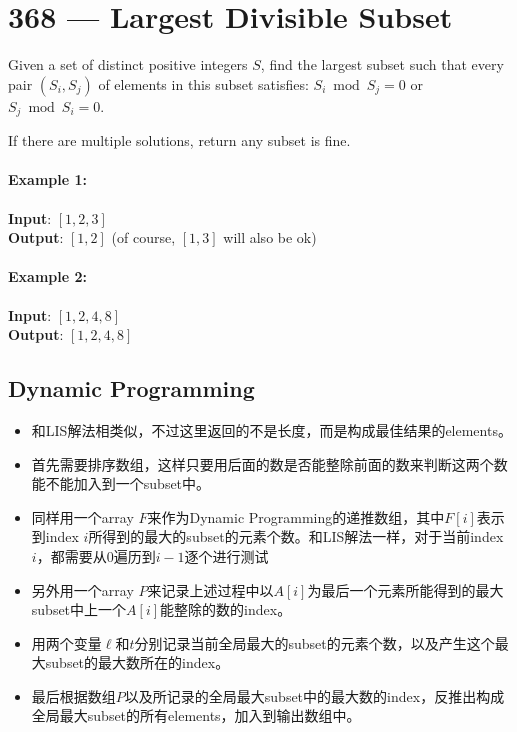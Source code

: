 \section{368 --- Largest Divisible Subset}
Given a set of distinct positive integers $S$, find the largest subset such that every pair $(S_i, S_j)$ of elements in this subset satisfies: $S_i \bmod S_j = 0$ or $S_j \bmod S_i = 0$.
\par
If there are multiple solutions, return any subset is fine.

\paragraph{Example 1:}

\begin{flushleft}
\textbf{Input}: $ [1,2,3] $
\\
\textbf{Output}: $ [1,2] $ (of course, $ [1,3] $ will also be ok)
\end{flushleft}

\paragraph{Example 2:}

\begin{flushleft}
\textbf{Input}: $ [1,2,4,8] $
\\
\textbf{Output}: $ [1,2,4,8] $
\end{flushleft}

\subsection{Dynamic Programming}
\begin{itemize}
\item 和LIS解法相类似，不过这里返回的不是长度，而是构成最佳结果的elements。
\item 首先需要排序数组，这样只要用后面的数是否能整除前面的数来判断这两个数能不能加入到一个subset中。 
\item 同样用一个array $F$来作为Dynamic Programming的递推数组，其中$F[i]$表示到index $i$所得到的最大的subset的元素个数。和LIS解法一样，对于当前index $i$，都需要从0遍历到$i-1$逐个进行测试
\item 另外用一个array $P$来记录上述过程中以$A[i]$为最后一个元素所能得到的最大subset中上一个$A[i]$能整除的数的index。
\item 用两个变量$\ell$和$t$分别记录当前全局最大的subset的元素个数，以及产生这个最大subset的最大数所在的index。
\item 最后根据数组$P$以及所记录的全局最大subset中的最大数的index，反推出构成全局最大subset的所有elements，加入到输出数组中。
\end{itemize}

